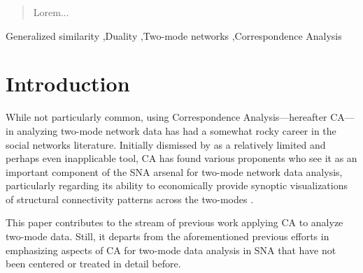 \documentclass[a4paper,fleqn]{cas-sc}
\begin{document}
\begin{abstract}
Lorem...
\end{abstract}


\begin{highlights}
    \item 
    \item 
    \item 
\end{highlights}

\begin{keywords}
Generalized similarity \sep Duality \sep Two-mode networks \sep Correspondence Analysis
\end{keywords}


\maketitle
\newpage

\section{Introduction}
While not particularly common, using Correspondence Analysis---hereafter CA---in analyzing two-mode network data has had a somewhat rocky career in the social networks literature. Initially dismissed by \citet{borgatti1997network} as a relatively limited and perhaps even inapplicable tool, CA has found various proponents who see it as an important component of the SNA arsenal for two-mode network data analysis, particularly regarding its ability to economically provide synoptic visualizations of structural connectivity patterns across the two-modes \citep{roberts2000correspondence, breiger2000tool, faust2005using}. 

This paper contributes to the stream of previous work applying CA to analyze two-mode data. Still, it departs from the aforementioned previous efforts in emphasizing aspects of CA for two-mode data analysis in SNA that have not been centered or treated in detail before. 
\end{document}
